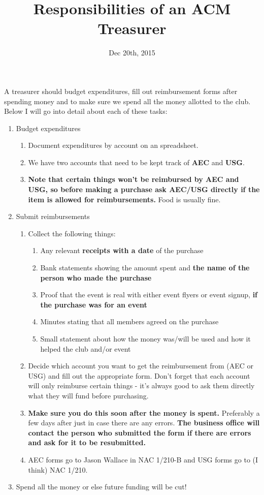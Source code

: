\documentclass{article}
\begin{document}
\title{Responsibilities of an ACM Treasurer}
\date{Dec 20th, 2015}
\maketitle

\begin{flushleft}
A treasurer should budget expenditures, fill out reimbursement forms after spending money and to make sure we spend all the money allotted to the club. Below I will go into detail about each of these tasks: 
\end{flushleft}

\begin{enumerate}
	\item Budget expenditures
	\begin{enumerate}
		\item Document expenditures by account on an spreadsheet. 
		\item We have two accounts that need to be kept track of \textbf{AEC} and \textbf{USG}.
		\item \textbf{Note that certain things won't be reimbursed by AEC and USG, so before making a purchase ask AEC/USG directly if the item is allowed for reimbursements.} Food is usually fine. 
	\end{enumerate}
	\item Submit reimbursements
	\begin{enumerate}
		\item Collect the following things:
		\begin{enumerate}  
			\item Any relevant \textbf{receipts with a date} of the purchase
			\item Bank statements showing the amount spent and \textbf{the name of the person who made the purchase} 
			\item Proof that the event is real with either event flyers or event signup, \textbf{if the purchase was for an event}
			\item Minutes stating that all members agreed on the purchase
			\item Small statement about how the money was/will be used and how it helped the club and/or event
		\end{enumerate}
		\item Decide which account you want to get the reimbursement from (AEC or USG) and fill out the appropriate form. Don't forget that each account will only reimburse certain things - it's always good to ask them directly what they will fund before purchasing.
		\item \textbf{Make sure you do this soon after the money is spent.} Preferably a few days after just in case there are any errors. \textbf{The business office will contact the person who submitted the form if there are errors and ask for it to be resubmitted.}
		\item AEC forms go to Jason Wallace in NAC 1/210-B and USG forms go to (I think) NAC 1/210.  
	\end{enumerate}
	\item Spend all the money or else future funding will be cut!
	
\end{enumerate}
\end{document}
